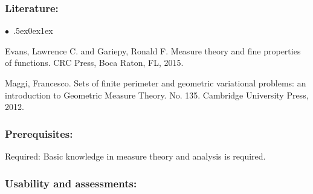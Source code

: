 \documentclass[a4paper,10pt]{article}
\renewenvironment{itemize}{\begin{list}{$\bullet$\ }{\itemsep.5ex\setlength{\topsep}{0.5\itemsep}\parsep0ex\labelsep1ex\settowidth{\labelwidth}{$\bullet$\ }\setlength{\leftmargin}{\labelwidth}\addtolength{\leftmargin}{3ex}\addtolength{\leftmargin}{\labelsep}}}{\end{list}}
\begin{document}
\subsubsection*{\large
    Literature:
}
\begin{itemize}
\item
  Evans, Lawrence C. and Gariepy, Ronald F. Measure theory and fine properties of functions.
CRC Press, Boca Raton, FL, 2015.
\item Maggi, Francesco. Sets of finite perimeter and geometric variational problems: an introduction
to Geometric Measure Theory. No. 135. Cambridge University Press, 2012.
\end{itemize}
\subsubsection*{\large
    Prerequisites:
}
Required: Basic knowledge in measure theory and analysis is required.
\cleardoublepage
\subsubsection*{\large
    Usability and assessments:
}
\end{document}
